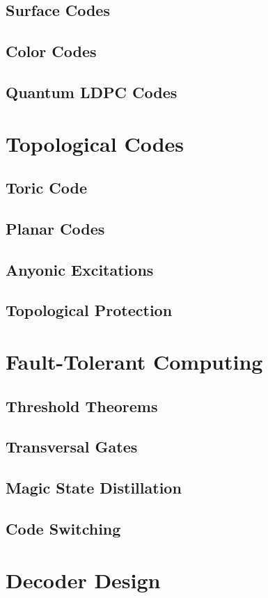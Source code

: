 \documentclass[12pt,a4paper]{book}
\begin{document}
\subsection{Surface Codes}
\subsection{Color Codes}
\subsection{Quantum LDPC Codes}

\section{Topological Codes}
\subsection{Toric Code}
\subsection{Planar Codes}
\subsection{Anyonic Excitations}
\subsection{Topological Protection}

\section{Fault-Tolerant Computing}
\subsection{Threshold Theorems}
\subsection{Transversal Gates}
\subsection{Magic State Distillation}
\subsection{Code Switching}

\section{Decoder Design}
\end{document}
